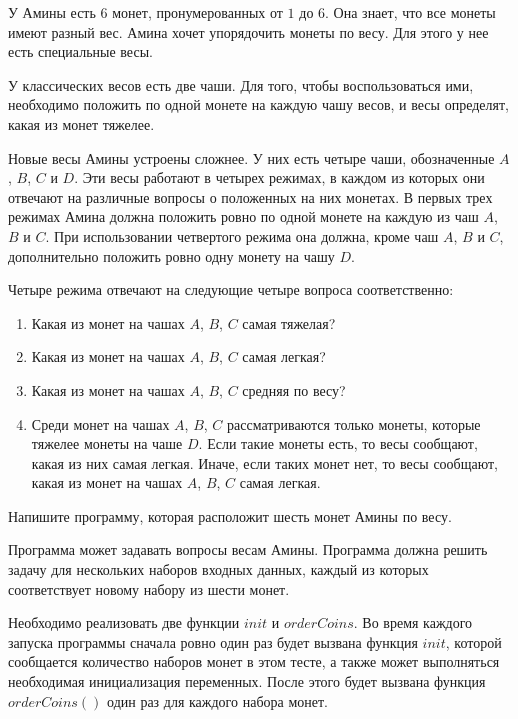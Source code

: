 У Амины есть $6$ монет, пронумерованных от $1$ до $6$. Она знает, что все монеты имеют разный
вес. Амина хочет упорядочить монеты по весу. Для этого у нее есть специальные весы.

У классических весов есть две чаши. Для того, чтобы воспользоваться ими, необходимо
положить по одной монете на каждую чашу весов, и весы определят, какая из монет тяжелее.

Новые весы Амины устроены сложнее. У них есть четыре чаши, обозначенные $A$, $B$, $C$ и $D$.
Эти весы работают в четырех режимах, в каждом из которых они отвечают на различные
вопросы о положенных на них монетах. В первых трех режимах Амина должна положить ровно
по одной монете на каждую из чаш $A$, $B$ и $C$. При использовании четвертого режима она
должна, кроме чаш $A$, $B$ и $C$, дополнительно положить ровно одну монету на чашу $D$.

Четыре режима отвечают на следующие четыре вопроса соответственно:
\begin{enumerate}
\item Какая из монет на чашах $A$, $B$, $C$ самая тяжелая?
\item Какая из монет на чашах $A$, $B$, $C$ самая легкая?
\item Какая из монет на чашах $A$, $B$, $C$ средняя по весу?
\item Среди монет на чашах $A$, $B$, $C$ рассматриваются только монеты, которые тяжелее
монеты на чаше $D$. Если такие монеты есть, то весы сообщают, какая из них самая
легкая. Иначе, если таких монет нет, то весы сообщают, какая из монет на чашах $A$, $B$,
$C$ самая легкая.
\end{enumerate}
Напишите программу, которая расположит шесть монет Амины по весу.

Программа может задавать вопросы весам Амины. Программа должна решить задачу для
нескольких наборов входных данных, каждый из которых соответствует новому набору из
шести монет.

Необходимо реализовать две функции $init$ и $orderCoins$. Во время каждого запуска
программы сначала ровно один раз будет вызвана функция $init$, которой сообщается
количество наборов монет в этом тесте, а также может выполняться необходимая
инициализация переменных. После этого будет вызвана функция $orderCoins()$ один раз для
каждого набора монет.

